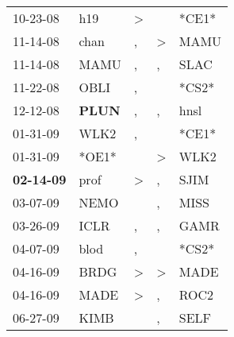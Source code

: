 \begin{supertabular}{p{0.07\textwidth}p{0.06\textwidth}p{0.02\textwidth}p{0.02\textwidth}p{0.06\textwidth}}
          10-23-08\textsuperscript{} &            h19\textsuperscript{} &     \textgreater &                  &                            *CE1* \\
          11-14-08\textsuperscript{} &           chan\textsuperscript{} &                , &     \textgreater &           MAMU\textsuperscript{} \\
          11-14-08\textsuperscript{} &           MAMU\textsuperscript{} &                , &                , &           SLAC\textsuperscript{} \\
          11-22-08\textsuperscript{} &           OBLI\textsuperscript{} &                , &                  &                            *CS2* \\
          12-12-08\textsuperscript{} &  \textbf{PLUN\textsuperscript{}} &                , &                , &           hnsl\textsuperscript{} \\
          01-31-09\textsuperscript{} &           WLK2\textsuperscript{} &                , &                  &                            *CE1* \\
          01-31-09\textsuperscript{} &                            *OE1* &                  &     \textgreater &           WLK2\textsuperscript{} \\
 \textbf{02-14-09\textsuperscript{}} &           prof\textsuperscript{} &     \textgreater &                , &           SJIM\textsuperscript{} \\
          03-07-09\textsuperscript{} &           NEMO\textsuperscript{} &                  &                , &           MISS\textsuperscript{} \\
          03-26-09\textsuperscript{} &           ICLR\textsuperscript{} &                , &                , &           GAMR\textsuperscript{} \\
          04-07-09\textsuperscript{} &           blod\textsuperscript{} &                , &                  &                            *CS2* \\
          04-16-09\textsuperscript{} &           BRDG\textsuperscript{} &     \textgreater &     \textgreater &           MADE\textsuperscript{} \\
          04-16-09\textsuperscript{} &           MADE\textsuperscript{} &     \textgreater &                , &           ROC2\textsuperscript{} \\
          06-27-09\textsuperscript{} &           KIMB\textsuperscript{} &                  &                , &           SELF\textsuperscript{} \\

\end{supertabular}
